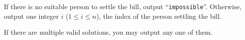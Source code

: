 
    If there is no suitable person to settle the bill, output ``\texttt{impossible}''.
    Otherwise, output one integer $i$ ($1 \leq i \leq n$), the index of the person settling the bill.

    If there are multiple valid solutions, you may output any one of them.
